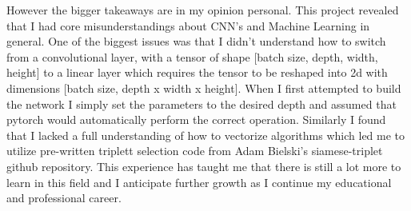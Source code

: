 \documentclass[10pt,twocolumn,letterpaper]{article}
\begin{document}
However the bigger takeaways are in my opinion personal. This project revealed that I had core misunderstandings about CNN's and Machine Learning in general.
One of the biggest issues was that I didn't understand how to switch from a convolutional layer, with a tensor of shape [batch size, depth, width, height] to a linear layer which requires the tensor to be reshaped into 2d with dimensions [batch size, depth x width x height].
When I first attempted to build the network I simply set the parameters to the desired depth and assumed that pytorch would automatically perform the correct operation.
Similarly I found that I lacked a full understanding of how to vectorize algorithms which led me to utilize pre-written triplett selection code from Adam Bielski's siamese-triplet github repository.
This experience has taught me that there is still a lot more to learn in this field and I anticipate further growth as I continue my educational and professional career.
\end{document}
